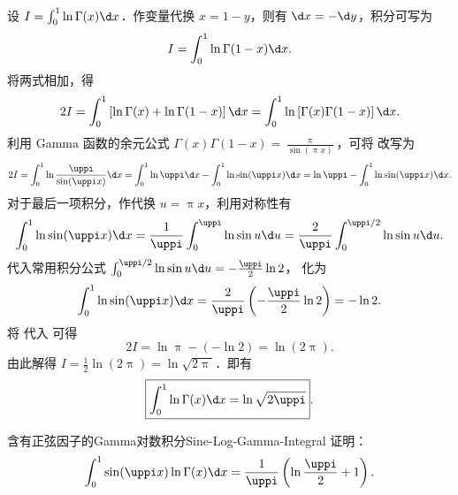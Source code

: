 \begin{myproof}
    设 $I = \int_0^1 \ln \Gamma(x) \d x$．作变量代换 $x = 1 - y$，则有 $\d x = -\d y$，积分可写为
    \begin{equation}\label{eq:q11-sub}
        I = \int_0^1 \ln \Gamma(1 - x) \d x.
    \end{equation}
    将两式相加，得
    \begin{equation}\label{eq:q11-add}
        2I = \int_0^1 \left[ \ln \Gamma(x) + \ln \Gamma(1 - x) \right] \d x = \int_0^1 \ln \left[ \Gamma(x) \Gamma(1 - x) \right] \d x.
    \end{equation}
    利用 Gamma 函数的余元公式 $\Gamma(x)\Gamma(1-x) = \frac{\uppi}{\sin(\uppi x)}$，可将  改写为
    \begin{equation}\label{eq:q11-reform}
        2I = \int_0^1 \ln \frac{\uppi}{\sin(\uppi x)} \d x = \int_0^1 \ln \uppi \d x - \int_0^1 \ln \sin(\uppi x) \d x = \ln \uppi - \int_0^1 \ln \sin(\uppi x) \d x.
    \end{equation}
    对于最后一项积分，作代换 $u = \uppi x$，利用对称性有
    \begin{equation}\label{eq:q11-sin-int}
        \int_0^1 \ln \sin(\uppi x) \d x = \frac{1}{\uppi} \int_0^{\uppi} \ln \sin u \d u = \frac{2}{\uppi} \int_0^{\uppi/2} \ln \sin u \d u.
    \end{equation}
    代入常用积分公式 $\int_0^{\uppi/2} \ln \sin u \d u = -\frac{\uppi}{2} \ln 2$， 化为
    \begin{equation}\label{eq:q11-sin-val}
        \int_0^1 \ln \sin(\uppi x) \d x = \frac{2}{\uppi} \left( -\frac{\uppi}{2} \ln 2 \right) = -\ln 2.
    \end{equation}
    将  代入  可得
    \begin{equation}\label{eq:q11-double-I}
        2I = \ln \uppi - (-\ln 2) = \ln(2\uppi).
    \end{equation}
    由此解得 $I = \frac{1}{2} \ln(2\uppi) = \ln \sqrt{2\uppi}$．即有
    \begin{equation}\label{eq:q11-final}
        \boxed{\int_0^1 \ln \Gamma(x) \d x = \ln \sqrt{2 \uppi}}.
    \end{equation}
\end{myproof}

\begin{problem}{含有正弦因子的Gamma对数积分}{Sine-Log-Gamma-Integral}
    证明：
    \begin{equation}\label{eq:q12-target}
        \int_0^1 \sin(\uppi x) \ln \Gamma(x) \d x = \frac{1}{\uppi} \left( \ln \frac{\uppi}{2} + 1 \right).
    \end{equation}
\end{problem}

